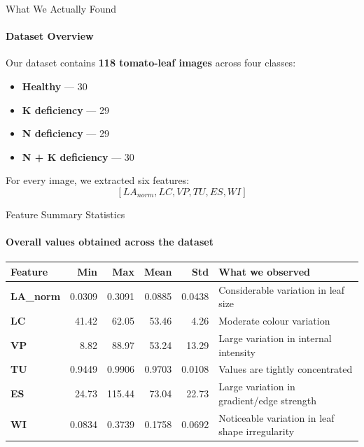 \documentclass[aspectratio=169, 11pt]{beamer}
\begin{document}
\begin{frame}{What We Actually Found}
    \framesubtitle{Dataset Overview}

    Our dataset contains \textbf{118 tomato-leaf images} across four classes:

    \vspace{0.3cm}
    \begin{itemize}
        \item \textbf{Healthy} --- 30
        \item \textbf{K deficiency} --- 29
        \item \textbf{N deficiency} --- 29
        \item \textbf{N + K deficiency} --- 30
    \end{itemize}

    \vspace{0.5cm}
    For every image, we extracted six features:
    $$ [LA_{norm}, LC, VP, TU, ES, WI] $$
\end{frame}

\begin{frame}{Feature Summary Statistics}
    \framesubtitle{Overall values obtained across the dataset}

    \begin{table}
        \centering
        \scriptsize
        \begin{tabular}{@{}lrrrrl@{}}
            \toprule
            \textbf{Feature} & \textbf{Min} & \textbf{Max} & \textbf{Mean} & \textbf{Std} & \textbf{What we observed} \\
            \midrule
            \textbf{LA\_norm} & 0.0309 & 0.3091 & 0.0885 & 0.0438 & Considerable variation in leaf size \\
            \textbf{LC}       & 41.42  & 62.05  & 53.46  & 4.26   & Moderate colour variation \\
            \textbf{VP}       & 8.82   & 88.97  & 53.24  & 13.29  & Large variation in internal intensity \\
            \textbf{TU}       & 0.9449 & 0.9906 & 0.9703 & 0.0108 & Values are tightly concentrated \\
            \textbf{ES}       & 24.73  & 115.44 & 73.04  & 22.73  & Large variation in gradient/edge strength \\
            \textbf{WI}       & 0.0834 & 0.3739 & 0.1758 & 0.0692 & Noticeable variation in leaf shape irregularity \\
            \bottomrule
        \end{tabular}
    \end{table}
\end{frame}
\end{document}
